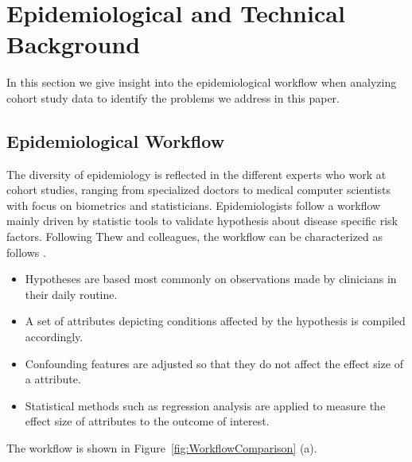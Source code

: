 \documentclass[journal]{style/vgtc} 			          %
\begin{document}


\section{Epidemiological and Technical Background} \label{MedicalAndTechnicalBackground}

In this section we give insight into the epidemiological workflow when analyzing cohort study data to identify the problems we address in this paper.
%
%
\subsection{Epidemiological Workflow} \label{EpidemiologicalWorkflow}
The diversity of epidemiology is reflected in the different experts who work at cohort studies, ranging from specialized doctors to medical computer scientists with focus on biometrics and statisticians.
%
Epidemiologists follow a workflow mainly driven by statistic tools to validate hypothesis about disease specific risk factors.
%
Following Thew and colleagues, the workflow can be characterized as follows \cite{Thew2009}.
%
\begin{itemize}
	\item Hypotheses are based most commonly on observations made by clinicians in their daily routine.
%
	\item A set of attributes depicting conditions affected by the hypothesis is compiled accordingly.
	\item Confounding features are adjusted so that they do not affect the effect size of a attribute.
%
	\item Statistical methods such as regression analysis are applied to measure the effect size of attributes to the outcome of interest.
\end{itemize}
The workflow is shown in Figure~\ref{fig:WorkflowComparison} (a).
\end{document}
